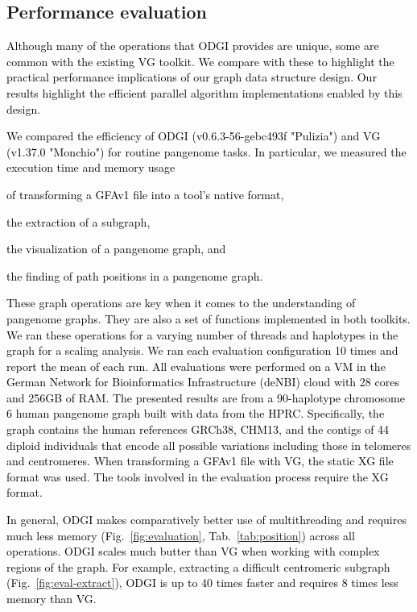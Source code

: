 \documentclass{bioinfo}
\newcommand{\REVIEWED}[1]{{\textcolor{Black}{#1}}}
\begin{document}
\vspace{0.22cm}

\subsection{Performance evaluation}
\label{sec:evaluation}

\REVIEWED{
Although many of the operations that ODGI provides are unique, some are common with the existing VG toolkit.
We compare with these to highlight the practical performance implications of our graph data structure design.
Our results highlight the efficient parallel algorithm implementations enabled by this design.}

\REVIEWED{We compared the efficiency of ODGI (v0.6.3-56-gebc493f "Pulizia") and VG (v1.37.0 "Monchio") for routine pangenome tasks. In particular, we measured the execution time and memory usage}
\begin{inparaenum}[(i)]
	\item \REVIEWED{of transforming a GFAv1 file into a tool's native format, }
	\item \REVIEWED{the extraction of a subgraph,}
	\item \REVIEWED{the visualization of a pangenome graph, and}
	\item \REVIEWED{the finding of path positions in a pangenome graph.}
\end{inparaenum}
\REVIEWED{These graph operations are key when it comes to the understanding of pangenome graphs.
They are also a set of functions implemented in both toolkits.
We ran these operations for a varying number of threads and haplotypes in the graph for a scaling analysis. We ran each evaluation configuration 10 times and report the mean of each run.
All evaluations were performed on a VM in the German Network for Bioinformatics Infrastructure (deNBI) cloud with 28 cores and 256GB of RAM.
The presented results are from a 90-haplotype chromosome 6 human pangenome graph built with data from the HPRC.
Specifically, the graph contains the human references GRCh38, CHM13, and the contigs of 44 diploid individuals that encode all possible variations including those in telomeres and centromeres.
When transforming a GFAv1 file with VG, the static XG file format was used.
The tools involved in the evaluation process require the XG format.}

\REVIEWED{In general, ODGI makes comparatively better use of multithreading and requires much less memory (Fig.~\ref{fig:evaluation}, Tab.~\ref{tab:position}) across all operations.
ODGI scales much butter than VG when working with complex regions of the graph.
For example, extracting a difficult centromeric subgraph (Fig.~\ref{fig:eval-extract}), ODGI is up to 40 times faster and requires 8 times less memory than VG.}
\end{document}
